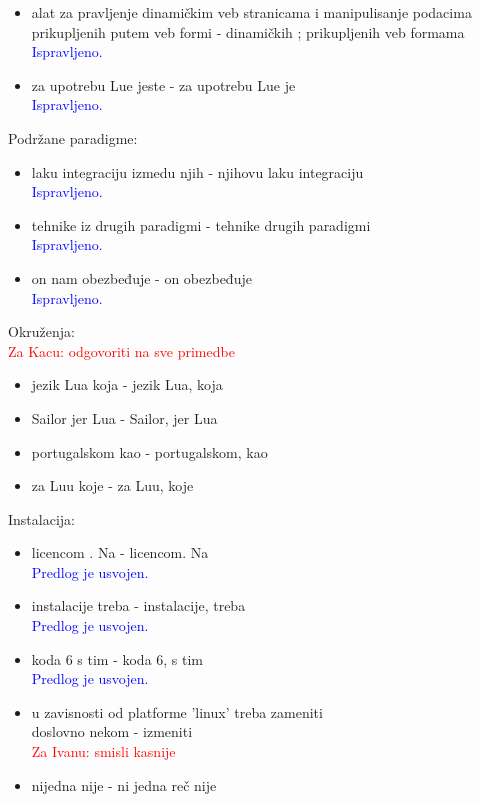 \documentclass[a4paper]{report}
\newcommand{\odgovorAutora}[1]{\textcolor{blue}{#1}}
\newcommand{\note}[1]{\textcolor{red}{#1}}
\begin{document}
{\begin{itemize}
  \odgovorAutora{Rečenica je prepravljena: ,,Ako se Lua upotrebljava u aplikaciji kao skript jezik, za njeno konfigurisanje potrebno je koristiti Lua-C API.''}
  \item alat za pravljenje dinamičkim veb stranicama i manipulisanje podacima prikupljenih putem veb formi - dinamičkih ; prikupljenih veb formama
  \odgovorAutora{Ispravljeno.}
  \item  za upotrebu Lue jeste - za upotrebu Lue je\\
  \odgovorAutora{Ispravljeno.}
\end{itemize}
Podržane paradigme:
\begin{itemize}
  \item laku integraciju izmedu njih - njihovu laku integraciju \\
  \odgovorAutora{Ispravljeno.}
  \item tehnike iz drugih paradigmi - tehnike drugih paradigmi \\
  \odgovorAutora{Ispravljeno.}
  \item on nam obezbeđuje - on obezbeđuje \\
  \odgovorAutora{Ispravljeno.}
\end{itemize}
Okruženja: \\
\note{Za Kacu: odgovoriti na sve primedbe} 
\begin{itemize}
  \item jezik Lua koja - jezik Lua, koja 
  \item Sailor jer Lua - Sailor, jer Lua 
  \item portugalskom kao - portugalskom, kao  
  \item  za Luu koje -  za Luu, koje
\end{itemize}
Instalacija:
\begin{itemize}
  \item licencom . Na - licencom. Na \\
  \odgovorAutora{Predlog je usvojen.}
  \item instalacije treba  - instalacije, treba \\
  \odgovorAutora{Predlog je usvojen.} 
  \item  koda 6 s tim -  koda 6, s tim \\
  \odgovorAutora{Predlog je usvojen.}
  \item  u zavisnosti od platforme ’linux’ treba zameniti \\ doslovno nekom - izmeniti \\
  \note{Za Ivanu: smisli kasnije}
  \item  nijedna nije - ni jedna reč nije \\

\end{itemize}}
\end{document}
